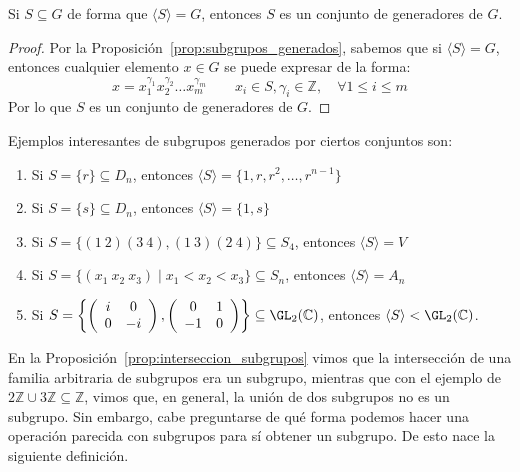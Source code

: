 \begin{coro}
    Si $S\subseteq G$ de forma que $\langle S \rangle =G$, entonces $S$ es un conjunto de generadores de $G$.
    \begin{proof}
        Por la Proposición~\ref{prop:subgrupos_generados}, sabemos que si $\langle S \rangle = G$, entonces cualquier elemento $x\in G$ se puede expresar de la forma:
        \begin{equation*}
            x = x_1^{\gamma_1}x_2^{\gamma_2}\ldots x_m^{\gamma_m} \qquad x_i \in S, \gamma_i \in \mathbb{Z}, \quad \forall 1\leq i \leq m
        \end{equation*}
        Por lo que $S$ es un conjunto de generadores de $G$.
    \end{proof}
\end{coro}

\begin{ejemplo}
    Ejemplos interesantes de subgrupos generados por ciertos conjuntos son:
    \begin{enumerate}
        \item Si $S= \{r\}\subseteq D_n$, entonces $\langle S \rangle = \{1,r,r^2, \ldots, r^{n-1}\}$
        \item Si $S = \{s\}\subseteq D_n$, entonces $\langle S \rangle = \{1, s\}$
        \item Si $S = \{(1\ 2)(3\ 4), (1\ 3)(2\ 4)\}\subseteq S_4$, entonces $\langle S \rangle = V$
        \item Si $S=\{(x_1\ x_2\ x_3) \mid x_1<x_2<x_3\}\subseteq S_n$, entonces $\langle S \rangle = A_n$
        \item Si $S = \left\{\left(\begin{array}{cc}
            i & 0 \\
            0 & -i 
        \end{array}\right),  \left(\begin{array}{cc}
            0 & 1 \\
            -1 & 0 
        \end{array}\right)\right\}\subseteq \GL_2(\mathbb{C})$, entonces $\langle S \rangle < \GL_2(\mathbb{C})$.
    \end{enumerate}
\end{ejemplo}

En la Proposición~\ref{prop:interseccion_subgrupos} vimos que la intersección de una familia arbitraria de subgrupos era un subgrupo, mientras que con el ejemplo de $2\mathbb{Z}\cup 3\mathbb{Z}\subseteq \mathbb{Z}$, vimos que, en general, la unión de dos subgrupos no es un subgrupo. Sin embargo, cabe preguntarse de qué forma podemos hacer una operación parecida con subgrupos para sí obtener un subgrupo. De esto nace la siguiente definición.

